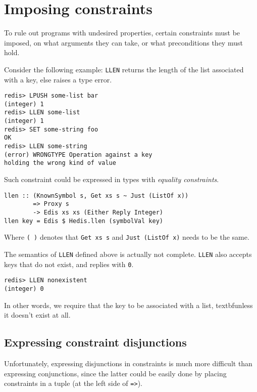 \documentclass[pldi]{sigplanconf-pldi16}
\begin{document}
\section{Imposing constraints}

To rule out programs with undesired properties, certain constraints must be
 imposed, on what arguments they can take, or what preconditions they must hold.

Consider the following example: \texttt{LLEN} returns the length of
 the list associated with a key, else raises a type error.

\begin{verbatim}
redis> LPUSH some-list bar
(integer) 1
redis> LLEN some-list
(integer) 1
redis> SET some-string foo
OK
redis> LLEN some-string
(error) WRONGTYPE Operation against a key
holding the wrong kind of value
\end{verbatim}

Such constraint could be expressed in types with
\emph{equality constraints}\cite{typeeq}.

\begin{verbatim}
llen :: (KnownSymbol s, Get xs s ~ Just (ListOf x))
        => Proxy s
        -> Edis xs xs (Either Reply Integer)
llen key = Edis $ Hedis.llen (symbolVal key)
\end{verbatim}

Where \texttt{(~)} denotes that \texttt{Get xs s}
and \texttt{Just (ListOf x)} needs to be the same.

The semantics of \texttt{LLEN} defined above is actually not
complete. \texttt{LLEN} also accepts keys that do not exist, and
 replies with \texttt{0}.

\begin{verbatim}
redis> LLEN nonexistent
(integer) 0
\end{verbatim}

In other words, we require that the key to be associated with a list,
 textbf{unless} it doesn't exist at all.

\subsection{Expressing constraint disjunctions}

Unfortunately, expressing disjunctions in constraints is much more difficult
 than expressing conjunctions, since the latter could be easily done by placing
 constraints in a tuple (at the left side of \texttt{=>}).
\end{document}
